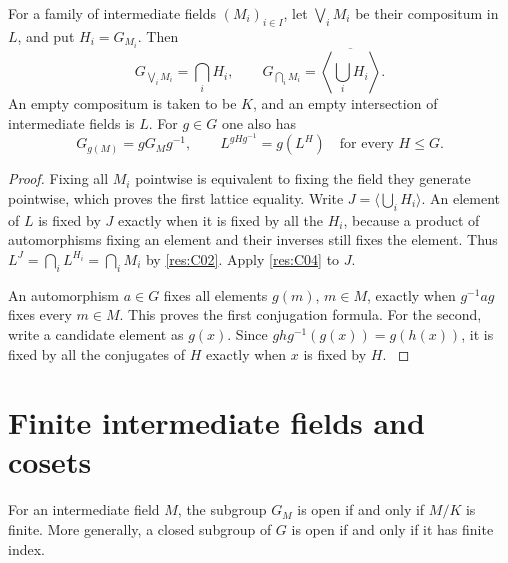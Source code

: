 \begin{corollary}
\label{res:C05}
For a family of intermediate fields \((M_i)_{i\in I}\), let
\(\bigvee_i M_i\) be their compositum in \(L\), and put \(H_i=G_{M_i}\).
Then
\[
  G_{\bigvee_i M_i}=\bigcap_i H_i,
  \qquad
  G_{\bigcap_i M_i}
     =\overline{\left\langle\bigcup_i H_i\right\rangle}.
\]
An empty compositum is taken to be \(K\), and an empty intersection
of intermediate fields is \(L\). For \(g\in G\) one also has
\[
  G_{g(M)}=gG_Mg^{-1},
  \qquad
  L^{gHg^{-1}}=g(L^H)\quad\text{for every }H\leq G.
\]
\end{corollary}

\begin{proof}
Fixing all \(M_i\) pointwise is equivalent to fixing the field they
generate pointwise, which proves the first lattice equality. Write
\(J=\langle\bigcup_i H_i\rangle\). An element of \(L\) is fixed by \(J\)
exactly when it is fixed by all the \(H_i\), because a product of
automorphisms fixing an element and their inverses still fixes the
element. Thus \(L^J=\bigcap_i L^{H_i}=\bigcap_i M_i\) by
\ref{res:C02}. Apply \ref{res:C04} to \(J\).

An automorphism \(a\in G\) fixes all elements \(g(m)\), \(m\in M\),
exactly when \(g^{-1}ag\) fixes every \(m\in M\). This proves the
first conjugation formula. For the second, write a candidate element
as \(g(x)\). Since \(ghg^{-1}(g(x))=g(h(x))\), it is fixed by all
the conjugates of \(H\) exactly when \(x\) is fixed by \(H\).
\cite[Theorem 7.13(c) and Remark 7.14]{milne}
\end{proof}

\section{Finite intermediate fields and cosets}

\begin{theorem}
\label{res:C06}
For an intermediate field \(M\), the subgroup \(G_M\) is open if
and only if \(M/K\) is finite. More generally, a closed subgroup
of \(G\) is open if and only if it has finite index.
\end{theorem}

